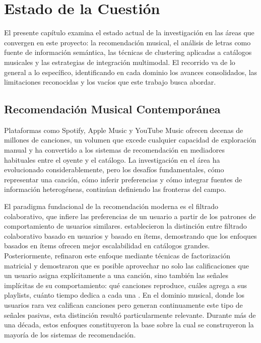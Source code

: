 \chapter{Estado de la Cuestión}
\label{ch:estado-cuestion}

El presente capítulo examina el estado actual de la investigación en las áreas que convergen en este proyecto: la recomendación musical, el análisis de letras como fuente de información semántica, las técnicas de clustering aplicadas a catálogos musicales y las estrategias de integración multimodal. El recorrido va de lo general a lo específico, identificando en cada dominio los avances consolidados, las limitaciones reconocidas y los vacíos que este trabajo busca abordar.

\section{Recomendación Musical Contemporánea}
\label{sec:recomendacion-contemporanea}

Plataformas como Spotify, Apple Music y YouTube Music ofrecen decenas de millones de canciones, un volumen que excede cualquier capacidad de exploración manual y ha convertido a los sistemas de recomendación en mediadores habituales entre el oyente y el catálogo. La investigación en el área ha evolucionado considerablemente, pero los desafíos fundamentales, cómo representar una canción, cómo inferir preferencias y cómo integrar fuentes de información heterogéneas, continúan definiendo las fronteras del campo.

El paradigma fundacional de la recomendación moderna es el filtrado colaborativo, que infiere las preferencias de un usuario a partir de los patrones de comportamiento de usuarios similares. \textcite{sarwar_2001_itembased} establecieron la distinción entre filtrado colaborativo basado en usuarios y basado en ítems, demostrando que los enfoques basados en ítems ofrecen mejor escalabilidad en catálogos grandes. Posteriormente, \textcite{koren_2009_mf} refinaron este enfoque mediante técnicas de factorización matricial y demostraron que es posible aprovechar no solo las calificaciones que un usuario asigna explícitamente a una canción, sino también las señales implícitas de su comportamiento: qué canciones reproduce, cuáles agrega a sus playlists, cuánto tiempo dedica a cada una \parencite{hu_2008_implicit_feedback}. En el dominio musical, donde los usuarios rara vez califican canciones pero generan continuamente este tipo de señales pasivas, esta distinción resultó particularmente relevante. Durante más de una década, estos enfoques constituyeron la base sobre la cual se construyeron la mayoría de los sistemas de recomendación.

